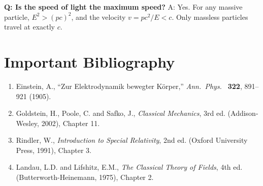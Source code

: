\textbf{Q: Is the speed of light the maximum speed?}
A: Yes. For any massive particle, $E^2 > (pc)^2$, and the velocity $v = pc^2/E < c$. Only massless particles travel at exactly $c$.
\section*{Important Bibliography}

\begin{enumerate}
\item Einstein, A., ``Zur Elektrodynamik bewegter K\"{o}rper,'' \textit{Ann.\ Phys.\ } \textbf{322}, 891--921 (1905).
\item Goldstein, H., Poole, C. and Safko, J., \textit{Classical Mechanics}, 3rd ed. (Addison-Wesley, 2002), Chapter 11.
\item Rindler, W., \textit{Introduction to Special Relativity}, 2nd ed. (Oxford University Press, 1991), Chapter 3.
\item Landau, L.D. and Lifshitz, E.M., \textit{The Classical Theory of Fields}, 4th ed. (Butterworth-Heinemann, 1975), Chapter 2.
\end{enumerate}

